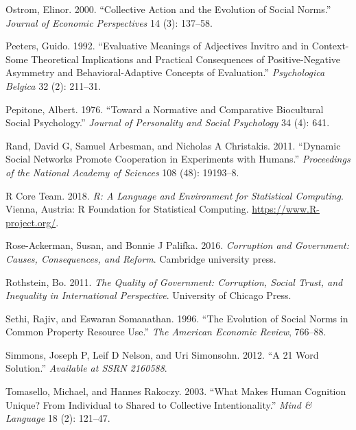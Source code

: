 \documentclass[man]{apa6}
\begin{document}
\leavevmode\hypertarget{ref-ostrom2000collective}{}%
Ostrom, Elinor. 2000. ``Collective Action and the Evolution of Social
Norms.'' \emph{Journal of Economic Perspectives} 14 (3): 137--58.

\leavevmode\hypertarget{ref-peeters1992evaluative}{}%
Peeters, Guido. 1992. ``Evaluative Meanings of Adjectives Invitro and in
Context-Some Theoretical Implications and Practical Consequences of
Positive-Negative Asymmetry and Behavioral-Adaptive Concepts of
Evaluation.'' \emph{Psychologica Belgica} 32 (2): 211--31.

\leavevmode\hypertarget{ref-pepitone1976toward}{}%
Pepitone, Albert. 1976. ``Toward a Normative and Comparative Biocultural
Social Psychology.'' \emph{Journal of Personality and Social Psychology}
34 (4): 641.

\leavevmode\hypertarget{ref-rand2011dynamic}{}%
Rand, David G, Samuel Arbesman, and Nicholas A Christakis. 2011.
``Dynamic Social Networks Promote Cooperation in Experiments with
Humans.'' \emph{Proceedings of the National Academy of Sciences} 108
(48): 19193--8.

\leavevmode\hypertarget{ref-R-base}{}%
R Core Team. 2018. \emph{R: A Language and Environment for Statistical
Computing}. Vienna, Austria: R Foundation for Statistical Computing.
\url{https://www.R-project.org/}.

\leavevmode\hypertarget{ref-rose2016corruption}{}%
Rose-Ackerman, Susan, and Bonnie J Palifka. 2016. \emph{Corruption and
Government: Causes, Consequences, and Reform}. Cambridge university
press.

\leavevmode\hypertarget{ref-rothstein2011quality}{}%
Rothstein, Bo. 2011. \emph{The Quality of Government: Corruption, Social
Trust, and Inequality in International Perspective}. University of
Chicago Press.

\leavevmode\hypertarget{ref-sethi1996evolution}{}%
Sethi, Rajiv, and Eswaran Somanathan. 1996. ``The Evolution of Social
Norms in Common Property Resource Use.'' \emph{The American Economic
Review}, 766--88.

\leavevmode\hypertarget{ref-simmons201221}{}%
Simmons, Joseph P, Leif D Nelson, and Uri Simonsohn. 2012. ``A 21 Word
Solution.'' \emph{Available at SSRN 2160588}.

\leavevmode\hypertarget{ref-tomasello2003makes}{}%
Tomasello, Michael, and Hannes Rakoczy. 2003. ``What Makes Human
Cognition Unique? From Individual to Shared to Collective
Intentionality.'' \emph{Mind \& Language} 18 (2): 121--47.
\end{document}
